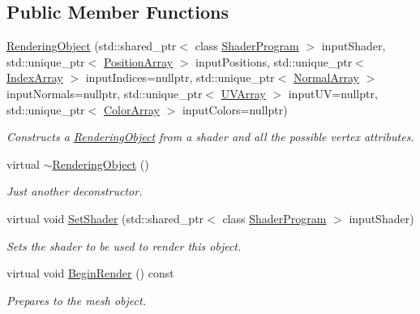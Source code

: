 \subsection*{Public Member Functions}
\begin{DoxyCompactItemize}
\item 
\hyperlink{class_rendering_object_a0550d86d49a01032921150d1c09c378f}{Rendering\+Object} (std\+::shared\+\_\+ptr$<$ class \hyperlink{class_shader_program}{Shader\+Program} $>$ input\+Shader, std\+::unique\+\_\+ptr$<$ \hyperlink{class_rendering_object_a1223b9cf03f2029b9c43d71042c2a18e}{Position\+Array} $>$ input\+Positions, std\+::unique\+\_\+ptr$<$ \hyperlink{class_rendering_object_a9931c88bca3384065c6691dfe1e60af1}{Index\+Array} $>$ input\+Indices=nullptr, std\+::unique\+\_\+ptr$<$ \hyperlink{class_rendering_object_a327c4d892de8d6138fb59afa6d078257}{Normal\+Array} $>$ input\+Normals=nullptr, std\+::unique\+\_\+ptr$<$ \hyperlink{class_rendering_object_a504ecd45ebe36dfa5b78c46d64d9904a}{U\+V\+Array} $>$ input\+U\+V=nullptr, std\+::unique\+\_\+ptr$<$ \hyperlink{class_rendering_object_a8a12e1f9be788d99af6c089e1c600022}{Color\+Array} $>$ input\+Colors=nullptr)
\begin{DoxyCompactList}\small\item\em Constructs a \hyperlink{class_rendering_object}{Rendering\+Object} from a shader and all the possible vertex attributes. \end{DoxyCompactList}\item 
virtual \hyperlink{class_rendering_object_ae4e8e14104ee3a587d10c9f90ec82048}{$\sim$\+Rendering\+Object} ()
\begin{DoxyCompactList}\small\item\em Just another deconstructor. \end{DoxyCompactList}\item 
virtual void \hyperlink{class_rendering_object_a22311d08bb7559f6b913afe314a5031e}{Set\+Shader} (std\+::shared\+\_\+ptr$<$ class \hyperlink{class_shader_program}{Shader\+Program} $>$ input\+Shader)
\begin{DoxyCompactList}\small\item\em Sets the shader to be used to render this object. \end{DoxyCompactList}\item 
virtual void \hyperlink{class_rendering_object_afa4510ba81fb7b17b940c92b27442d93}{Begin\+Render} () const 
\begin{DoxyCompactList}\small\item\em Prepares to the mesh object. \end{DoxyCompactList}\item 

\end{DoxyCompactItemize}

